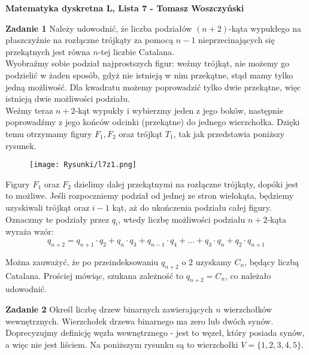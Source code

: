 \documentclass[a4paper,12pt]{article}
\begin{document}
\noindent \textbf{Matematyka dyskretna L, Lista 7 - Tomasz Woszczyński}\newline

\noindent \newline \textbf{Zadanie 1} \newline
Należy udowodnić, że liczba podziałów $(n+2)$-kąta wypukłego na płaszczyźnie na rozłączne trójkąty za pomocą $n-1$ nieprzecinających się przekątnych jest równa $n$-tej liczbie Catalana. \\

\noindent Wyobraźmy sobie podział najprostszych figur: weźmy trójkąt, nie możemy go podzielić w żaden sposób, gdyż nie istnieją w nim przekątne, stąd mamy tylko jedną możliwość. Dla kwadratu możemy poprowadzić tylko dwie przekątne, więc istnieją dwie możliwości podziału. \\

\noindent Weźmy teraz $n+2$-kąt wypukły i wybierzmy jeden z jego boków, następnie poprowadźmy z jego końców odcinki (przekątne) do jednego wierzchołka. Dzięki temu otrzymamy figury $F_1, F_2$ oraz trójkąt $T_1$, tak jak przedstawia poniższy rysunek.

\begin{figure}[H]
	\centering
	\texttt{[image: Rysunki/l7z1.png]}
\end{figure}

\noindent Figury $F_1$ oraz $F_2$ dzielimy dalej przekątnymi na rozłączne trójkąty, dopóki jest to możliwe. Jeśli rozpoczniemy podział od jednej ze stron wielokąta, będziemy uzyskiwali trójkąt oraz $i-1$ kąt, aż do ukończenia podziału całej figury. Oznaczmy te podziały przez $q_i$, wtedy liczbę możliwości podziału $n+2$-kąta wyraża wzór:
\[ q_{n+2} = q_{n+1} \cdot q_2 + q_{n} \cdot q_3 + q_{n-1} \cdot q_4 + \ldots + q_3 \cdot q_{n} + q_2 \cdot q_{n+1} \]

\noindent Można zauważyć, że po przeindeksowaniu $q_{n+2}$ o $2$ uzyskamy $C_n$, będący liczbą Catalana. Prościej mówiąc, szukana zależność to $q_{n+2} = C_n$, co należało udowodnić.


\newpage
\noindent \textbf{Zadanie 2} \newline
Określ liczbę drzew binarnych zawierających $n$ wierzchołków wewnętrznych. Wierzchołek drzewa binarnego ma zero lub dwóch synów. \\

\noindent Doprecyzujmy definicję węzła wewnętrznego - jest to węzeł, który posiada synów, a więc nie jest liściem. Na poniższym rysunku są to wierzchołki $V = \{ 1, 2, 3, 4, 5 \}$.
\end{document}
